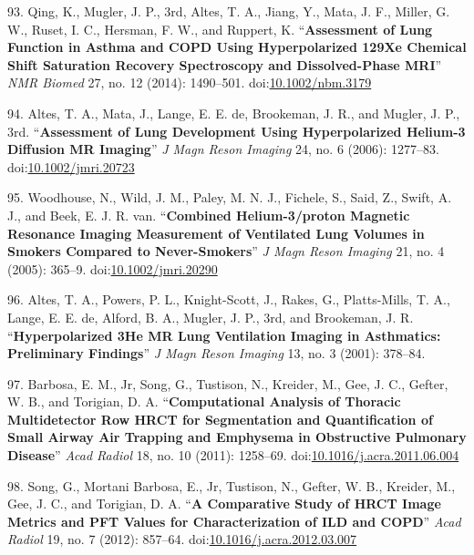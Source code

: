 \documentclass[11pt,]{article}
\begin{document}
\hypertarget{ref-Qing:2014ab}{}
93. Qing, K., Mugler, J. P., 3rd, Altes, T. A., Jiang, Y., Mata, J. F.,
Miller, G. W., Ruset, I. C., Hersman, F. W., and Ruppert, K.
``\textbf{Assessment of Lung Function in Asthma and COPD Using
Hyperpolarized 129Xe Chemical Shift Saturation Recovery Spectroscopy and
Dissolved-Phase MRI}'' \emph{NMR Biomed} 27, no. 12 (2014): 1490--501.
doi:\href{https://doi.org/10.1002/nbm.3179}{10.1002/nbm.3179}

\hypertarget{ref-Altes:2006aa}{}
94. Altes, T. A., Mata, J., Lange, E. E. de, Brookeman, J. R., and
Mugler, J. P., 3rd. ``\textbf{Assessment of Lung Development Using
Hyperpolarized Helium-3 Diffusion MR Imaging}'' \emph{J Magn Reson
Imaging} 24, no. 6 (2006): 1277--83.
doi:\href{https://doi.org/10.1002/jmri.20723}{10.1002/jmri.20723}

\hypertarget{ref-Woodhouse:2005aa}{}
95. Woodhouse, N., Wild, J. M., Paley, M. N. J., Fichele, S., Said, Z.,
Swift, A. J., and Beek, E. J. R. van. ``\textbf{Combined Helium-3/proton
Magnetic Resonance Imaging Measurement of Ventilated Lung Volumes in
Smokers Compared to Never-Smokers}'' \emph{J Magn Reson Imaging} 21, no.
4 (2005): 365--9.
doi:\href{https://doi.org/10.1002/jmri.20290}{10.1002/jmri.20290}

\hypertarget{ref-Altes:2001aa}{}
96. Altes, T. A., Powers, P. L., Knight-Scott, J., Rakes, G.,
Platts-Mills, T. A., Lange, E. E. de, Alford, B. A., Mugler, J. P., 3rd,
and Brookeman, J. R. ``\textbf{Hyperpolarized 3He MR Lung Ventilation
Imaging in Asthmatics: Preliminary Findings}'' \emph{J Magn Reson
Imaging} 13, no. 3 (2001): 378--84.

\hypertarget{ref-Barbosa:2011aa}{}
97. Barbosa, E. M., Jr, Song, G., Tustison, N., Kreider, M., Gee, J. C.,
Gefter, W. B., and Torigian, D. A. ``\textbf{Computational Analysis of
Thoracic Multidetector Row HRCT for Segmentation and Quantification of
Small Airway Air Trapping and Emphysema in Obstructive Pulmonary
Disease}'' \emph{Acad Radiol} 18, no. 10 (2011): 1258--69.
doi:\href{https://doi.org/10.1016/j.acra.2011.06.004}{10.1016/j.acra.2011.06.004}

\hypertarget{ref-Song:2012aa}{}
98. Song, G., Mortani Barbosa, E., Jr, Tustison, N., Gefter, W. B.,
Kreider, M., Gee, J. C., and Torigian, D. A. ``\textbf{A Comparative
Study of HRCT Image Metrics and PFT Values for Characterization of ILD
and COPD}'' \emph{Acad Radiol} 19, no. 7 (2012): 857--64.
doi:\href{https://doi.org/10.1016/j.acra.2012.03.007}{10.1016/j.acra.2012.03.007}
\end{document}
